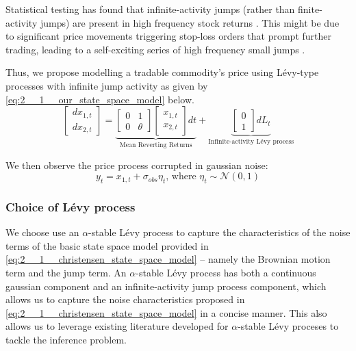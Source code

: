 \documentclass[../main.tex]{subfiles}
\begin{document}
Statistical testing has found that infinite-activity jumps (rather than finite-activity jumps) are present in high frequency stock returns \cite{ait2011testing}. This might be due to significant price movements triggering stop-loss orders that prompt further trading, leading to a self-exciting series of high frequency small jumps \cite{osler2005stop}.

Thus, we propose modelling a tradable commodity's price using Lévy-type processes with infinite jump activity as given by \autoref{eq:2__1__our_state_space_model} below.
\begin{equation}
    \begin{bmatrix}
    dx_{1,t} \\ dx_{2,t}
    \end{bmatrix} = 
    \underbrace{
        \begin{bmatrix}
        0 & 1 \\ 0 & \theta
        \end{bmatrix}
        \begin{bmatrix}
        x_{1,t} \\ x_{2,t}
        \end{bmatrix} dt
    }_{\text{Mean Reverting Returns}} 
    + 
    \underbrace{
        \begin{bmatrix}
        0 \\ 1
        \end{bmatrix} dL_t
    }_{\text{Infinite-activity Lévy process}}
    \label{eq:2__1__our_state_space_model}
\end{equation}

We then observe the price process corrupted in gaussian noise:
\begin{equation}
    y_t = x_{1,t} + \sigma_{obs} \eta_t \text{, where } \eta_t \sim \mathcal{N}(0,1)
\end{equation}

\subsubsection{Choice of Lévy process}

We choose use an $\alpha$-stable Lévy process to capture the characteristics of the noise terms of the basic state space model provided in \autoref{eq:2__1__christensen_state_space_model} -- namely the Brownian motion term and the jump term. An $\alpha$-stable Lévy process has both a continuous gaussian component and an infinite-activity jump process component, which allows us to capture the noise characteristics proposed in \autoref{eq:2__1__christensen_state_space_model} in a concise manner. This also allows us to leverage existing literature developed for $\alpha$-stable Lévy proceses to tackle the inference problem. 
\end{document}
